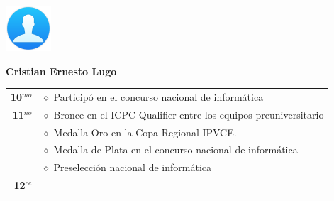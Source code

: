 \begin{minipage}{0.2\textwidth}
	\includegraphics[width=\linewidth]{img/concursantes/user.png} %
\end{minipage}
\hfill
\begin{minipage}{0.7\textwidth}
	\textbf{Cristian Ernesto Lugo}
	
	\vspace*{0.1in}
	\begin{tabular}{rl}
		
		\textbf{10$^{mo}$} & $\diamond$ Participó en el concurso nacional de informática \\
		
		\textbf{11$^{no}$} 
		& $\diamond$ Bronce en el ICPC Qualifier entre los equipos preuniversitario  \\
		& $\diamond$ Medalla Oro en la Copa Regional IPVCE. \\
		& $\diamond$ Medalla de Plata en el concurso nacional de informática \\
		& $\diamond$ Preselección nacional de informática  \\
		
		\textbf{12$^{ce}$} &   \\
		
		
	\end{tabular}
\end{minipage}

